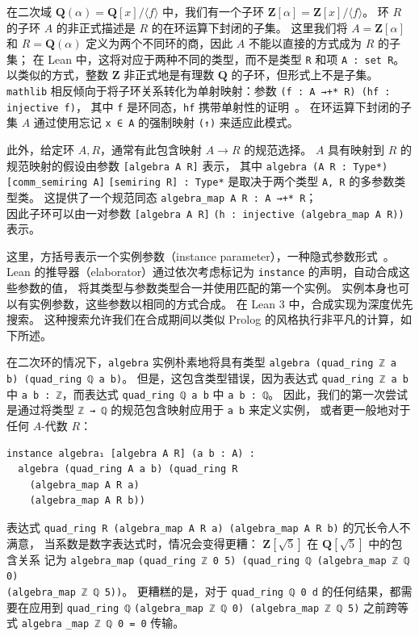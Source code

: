 \documentclass[sigplan,10pt,nonacm,
screen]{acmart} \settopmatter{printfolios=true,printccs=false,printacmref=false}
\newcommand{\mathlib}{\lstinline{mathlib}\xspace}
\newcommand{\QQ}{\mathbf{Q}}
\newcommand{\ZZ}{\mathbf{Z}}
\begin{document}
在二次域 $\QQ(\alpha) = \QQ[x] / \langle f\rangle$ 中，我们有一个子环 $\ZZ[\alpha] = \ZZ[x] / \langle f\rangle$。
环 $R$ 的子环 $A$ 的非正式描述是 $R$ 的在环运算下封闭的子集。
这里我们将 $A = \ZZ[\alpha]$ 和 $R = \QQ(\alpha)$ 定义为两个不同环的商，因此 $A$ 不能以直接的方式成为 $R$ 的子集；
在 Lean 中，这将对应于两种不同的类型，而不是类型 \lstinline{R} 和项 \lstinline{A : set R}。
以类似的方式，整数 $\ZZ$ 非正式地是有理数 $\QQ$ 的子环，但形式上不是子集。
\mathlib 相反倾向于将子环关系转化为单射映射：参数 \lstinline{(f : A →+* R) (hf : injective f)}，
其中 \lstinline{f} 是环同态，\lstinline{hf} 携带单射性的证明~\cite{baanen_formalization_2021}。
在环运算下封闭的子集 $A$ 通过使用忘记 \lstinline{x ∈ A} 的强制映射 \lstinline{(↑)} 来适应此模式。

此外，给定环 $A, R$，通常有此包含映射 $A \to R$ 的规范选择。
$A$ 具有映射到 $R$ 的规范映射的假设由参数 \lstinline{[algebra A R]} 表示，
其中 \lstinline{algebra (A R : Type*) [comm_semiring A]} %
\lstinline{[semiring R] : Type*} 是取决于两个类型 \lstinline{A, R} 的多参数类型类。
这提供了一个规范同态 \lstinline{algebra_map A R : A →+* R}；\\ %
因此子环可以由一对参数 \lstinline{[algebra A R]} \lstinline{(h : injective (algebra_map A R))} 表示。 %

这里，方括号表示一个实例参数（instance parameter），一种隐式参数形式~\cite{typeclasses}。
Lean 的推导器（elaborator）通过依次考虑标记为 \lstinline{instance} 的声明，自动合成这些参数的值，
将其类型与参数类型合一并使用匹配的第一个实例。
实例本身也可以有实例参数，这些参数以相同的方式合成。
在 Lean 3 中，合成实现为深度优先搜索。
这种搜索允许我们在合成期间以类似 Prolog 的风格执行非平凡的计算，如下所述。

在二次环的情况下，\lstinline{algebra} 实例朴素地将具有类型 \lstinline{algebra (quad_ring ℤ a b) (quad}\-\lstinline{_ring ℚ a b)}。 %
但是，这包含类型错误，因为表达式 \lstinline{quad_ring ℤ a b} 中 \lstinline{a b : ℤ}，而表达式 \lstinline{quad_ring ℚ a b} 中 \lstinline{a b : ℚ}。
因此，我们的第一次尝试是通过将类型 \lstinline{ℤ → ℚ} 的规范包含映射应用于 \lstinline{a b} 来定义实例，
或者更一般地对于任何 $A$-代数 $R$：
\begin{lstlisting}
instance algebra₁ [algebra A R] (a b : A) :
  algebra (quad_ring A a b) (quad_ring R
    (algebra_map A R a)
    (algebra_map A R b))
\end{lstlisting}
表达式 \lstinline{quad_ring R (algebra_map A R a) (algebra_map A R b)} 的冗长令人不满意，
当系数是数字表达式时，情况会变得更糟：
$\ZZ[\sqrt{5}]$ 在 $\QQ[\sqrt{5}]$ 中的包含关系
记为 \lstinline{algebra_map} \lstinline{(quad_ring ℤ 0 5) (quad_ring ℚ (algebra_map ℤ ℚ 0)}\\ \lstinline{(algebra_map ℤ ℚ 5))}。
更糟糕的是，对于 \lstinline{quad}\-\lstinline{_ring ℚ 0 d} 的任何结果，都需要在应用到 \lstinline{quad_ring ℚ} \lstinline{(algebra_}\-\lstinline{map ℤ ℚ 0) (algebra_map ℤ ℚ 5)} 之前跨等式 \lstinline{algebra}\-%
\lstinline{_map ℤ ℚ 0 = 0} 传输。
\end{document}
